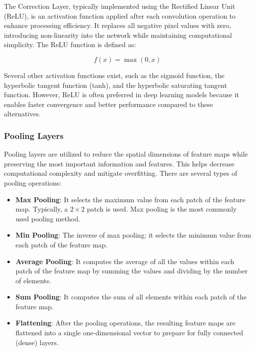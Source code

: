 The Correction Layer, typically implemented using the Rectified Linear Unit (ReLU), is an activation function applied after each convolution operation to enhance processing efficiency. It replaces all negative pixel values with zero, introducing non-linearity into the network while maintaining computational simplicity. The ReLU function is defined as:

\begin{equation}
  f(x) = \max(0, x)
\end{equation}

Several other activation functions exist, such as the sigmoid function, the hyperbolic tangent function (tanh), and the hyperbolic saturating tangent function. However, ReLU is often preferred in deep learning models because it enables faster convergence and better performance compared to these alternatives.

\subsubsection{Pooling Layers}

Pooling layers are utilized to reduce the spatial dimensions of feature maps while preserving the most important information and features. This helps decrease computational complexity and mitigate overfitting. There are several types of pooling operations:

\begin{itemize}
  \item \textbf{Max Pooling}:
        It selects the maximum value from each patch of the feature map. Typically, a $2 \times 2$ patch is used. Max pooling is the most commonly used pooling method.

  \item \textbf{Min Pooling}:
        The inverse of max pooling; it selects the minimum value from each patch of the feature map.

  \item \textbf{Average Pooling}:
        It computes the average of all the values within each patch of the feature map by summing the values and dividing by the number of elements.

  \item \textbf{Sum Pooling}:
        It computes the sum of all elements within each patch of the feature map.

  \item \textbf{Flattening}:
        After the pooling operations, the resulting feature maps are flattened into a single one-dimensional vector to prepare for fully connected (dense) layers.
\end{itemize}

